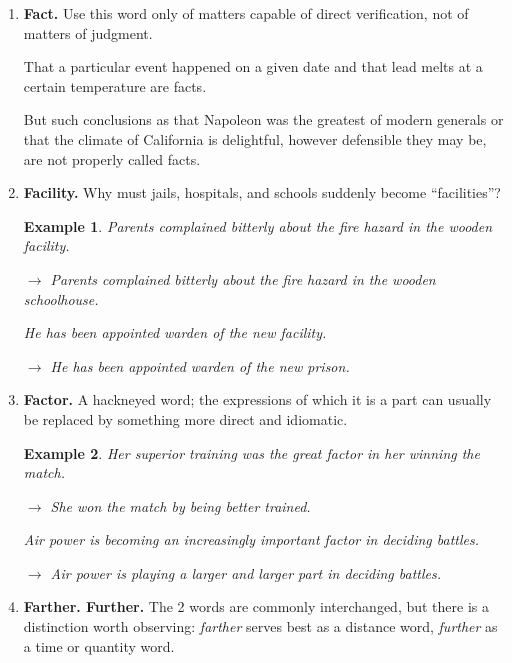 \documentclass{book}
\numberwithin{equation}{section}
\newtheorem{example}{Example}[chapter]
\begin{document}
\begin{enumerate}
    Least open to objection when it represents the last terms of a list already given almost in full, or immaterial words at the end of a quotation.
    
    At the end of a list introduced by \textit{such as, for example}, or any similar expression, \textit{etc.} is incorrect.
    
    In formal writing, \textit{etc.} is a misfit.
    
    An item important enough to call for \textit{etc.} is probably important enough to be named.
    \item \textbf{Fact.} Use this word only of matters capable of direct verification, not of matters of judgment.
    
    That a particular event happened on a given date and that lead melts at a certain temperature are facts.
    
    But such conclusions as that Napoleon was the greatest of modern generals or that the climate of California is delightful, however defensible they may be, are not properly called facts.
    \item \textbf{Facility.} Why must jails, hospitals, and schools suddenly become ``facilities''?
    \begin{example}
        Parents complained bitterly about the fire hazard in the wooden facility.
        
        $\to$ Parents complained bitterly about the fire hazard in the wooden schoolhouse.
        
        He has been appointed warden of the new facility.
        
        $\to$ He has been appointed warden of the new prison.
    \end{example}
    \item \textbf{Factor.} A hackneyed word; the expressions of which it is a part can usually be replaced by something more direct and idiomatic.
    \begin{example}
        Her superior training was the great factor in her winning the match.
        
        $\to$ She won the match by being better trained.
        
        Air power is becoming an increasingly important factor in deciding battles.
        
        $\to$ Air power is playing a larger and larger part in deciding battles.
    \end{example}
    \item \textbf{Farther. Further.} The 2 words are commonly interchanged, but there is a distinction worth observing: \textit{farther} serves best as a distance word, \textit{further} as a time or quantity word.
    

\end{enumerate}
\end{document}
